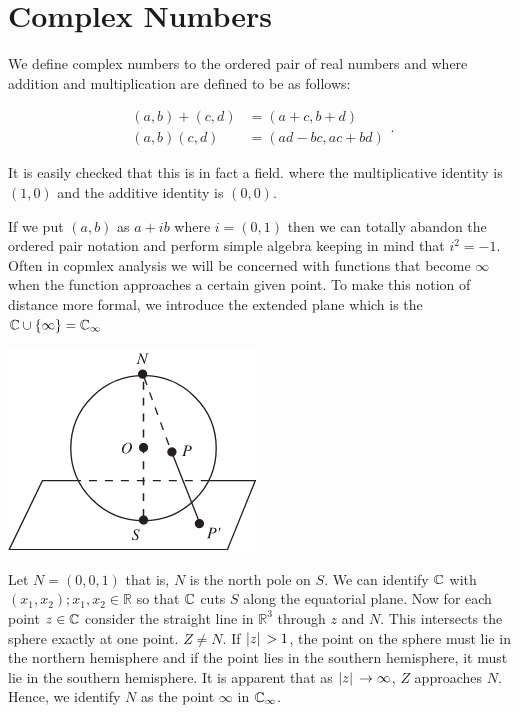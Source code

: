 \chapter{Complex Numbers}

\begin{definitionbox}
	\begin{Definition}\label{Complex Numbers}
		We define complex numbers to the ordered pair of real numbers and where addition and multiplication are defined to be as follows:

		\[
			\begin{split}
			\left( a,b \right) + \left( c,d  \right) &= \left( a+c, b+d \right) \\
			\left( a,b \right)  \left( c,d  \right) &= \left( ad-bc, ac+bd \right) 
			\end{split}
		.\]

		It is easily checked that this is in fact a field.
		where the multiplicative identity is $\left( 1,0 \right)$ and the additive identity is $\left( 0, 0 \right) $. 
	\end{Definition}
\end{definitionbox}

If we put $\left( a,b \right) $ as $a+ib$ where $i = (0,1)$ then we can totally abandon the ordered pair notation and perform simple algebra keeping in mind that $i^2 = -1$. \\

Often in copmlex analysis we will be concerned with functions that become $\infty$ when the function approaches a certain given point. To make this notion of distance more formal, we introduce the extended plane  which is the $\mathbb{C} \cup \left\{\infty \right\}  = \mathbb{C}_\infty$

\begin{center}
	\includegraphics{img/Unknown.png}
\end{center}

Let $N = \left( 0,0,1 \right) $ that is, $N$ is the north pole on $S$. We can identify $\mathbb{C}$ with $\left( x_1, x_2 \right); x_1, x_2 \in  \mathbb{R}$ so that $\mathbb{C}$ cuts $S$ along the equatorial  plane. Now for each point $z \in \mathbb{C}$ consider the straight line in $\mathbb{R}^3$ through $z$ and $N$. This intersects the sphere exactly at one point. $Z \neq N$. If $ \abs{z} > 1$, the point on the sphere must lie in the northern hemisphere and if the point lies in the southern hemisphere, it must lie in the southern hemisphere. It is apparent that as $\abs{z} \to \infty$, $Z$  approaches $N$. Hence, we identify $N$ as the point $\infty$ in $\mathbb{C}_\infty$. \\


